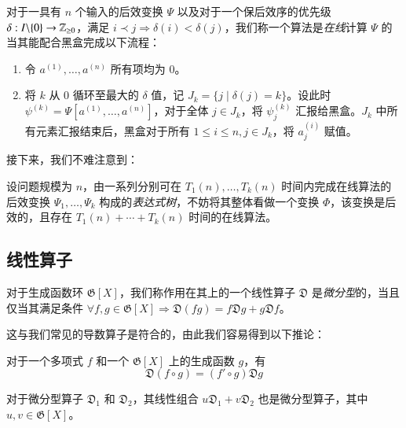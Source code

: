 \begin{definition} [在线算法]
对于一具有 $n$ 个输入的后效变换 $\Psi$ 以及对于一个保后效序的优先级 $\delta: {I \backslash \{0\}} \rightarrow \mathbb Z_{\ge 0}$，满足 $i \prec j \Rightarrow \delta(i) < \delta(j)$，我们称一个算法是\emph{在线}计算 $\Psi$ 的当其能配合黑盒完成以下流程：
\begin{enumerate}
\item 令 $a^{(1)}, \dots, a^{(n)}$ 所有项均为 $0$。

\item 将 $k$ 从 $0$ 循环至最大的 $\delta$ 值，记 $J_k = \{ j \mid \delta(j) = k \}$。设此时 $\psi^{(k)} = \Psi[a^{(1)}, \dots, a^{(n)}]$，对于全体 $j\in J_k$，将 $\psi^{(k)}_j$ 汇报给黑盒。$J_k$ 中所有元素汇报结束后，黑盒对于所有 $1\le i\le n, j\in J_k$，将 $a^{(i)}_j$ 赋值。
\end{enumerate}
\end{definition}

接下来，我们不难注意到：

\begin{lemma}
设问题规模为 $n$，由一系列分别可在 $T_1(n),\dots,T_k(n)$ 时间内完成在线算法的后效变换 $\Psi_1,\dots, \Psi_k$ 构成的\emph{表达式树}，不妨将其整体看做一个变换 $\Phi$，该变换是后效的，且存在 $T_1(n) + \cdots + T_k(n)$ 时间的在线算法。
\end{lemma}

\subsection{线性算子}

\begin{definition}[微分型算子]
对于生成函数环 $\mathfrak G[X]$，我们称作用在其上的一个线性算子 $\mathfrak D$ 是\emph{微分型}的，当且仅当其满足条件 $\forall f,g\in \mathfrak G[X] \Rightarrow \mathfrak D(fg) = f\mathfrak D g+g\mathfrak D f$。
\end{definition}

这与我们常见的导数算子是符合的，由此我们容易得到以下推论：

\begin{lemma}
对于一个多项式 $f$ 和一个 $\mathfrak G[X]$ 上的生成函数 $g$，有
$$
\mathfrak D (f\circ g) = (f' \circ g) \mathfrak D g
$$
\end{lemma}

\begin{lemma}
对于微分型算子 $\mathfrak D_1$ 和 $\mathfrak D_2$，其线性组合 $u\mathfrak D_1 + v\mathfrak D_2$ 也是微分型算子，其中 $u,v\in \mathfrak G[X]$。
\end{lemma}

